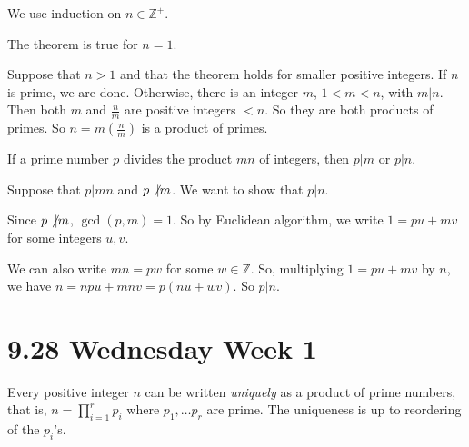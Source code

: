 \documentclass{notes}
\begin{document}
\begin{prf}
  We use induction on $n \in \mathbb Z^+$.

  The theorem is true for $n = 1$.

  Suppose that $n > 1$ and that the theorem holds for smaller positive integers.
  If $n$ is prime, we are done.
  Otherwise, there is an integer $m$, $1 < m < n$, with $m \vert n$.
  Then both $m$ and $\frac{n}{m}$ are positive integers $< n$.
  So they are both products of primes.
  So $n = m \left ( \frac{n}{m} \right )$ is a product of primes.
\end{prf}

\begin{lem}
  If a prime number $p$ divides the product $m n$ of integers, then $p \vert m$ or $p \vert n$.
\end{lem}

\begin{prf}
  Suppose that $p \vert m n$ and $p \not \vert m$.
  We want to show that $p \vert n$.

  Since $p \not \vert m$, $\gcd(p, m) = 1$.
  So by Euclidean algorithm, we write $1 = p u + m v$ for some integers $u, v$.

  We can also write $m n = p w$ for some $w \in \mathbb Z$.
  So, multiplying $1 = p u + m v$ by $n$, we have $n = n p u + m n v = p (n u + w v)$.
  So $p \vert n$.
\end{prf}

\newpage

\section{9.28 Wednesday Week 1}

\begin{thm}
  Every positive integer $n$ can be written \textit{uniquely} as a product of prime numbers, that is, $n = \prod_{i = 1}^r p_i$ where $p_1, \dots p_r$ are prime.
  The uniqueness is up to reordering of the $p_i$'s.
\end{thm}
\end{document}

